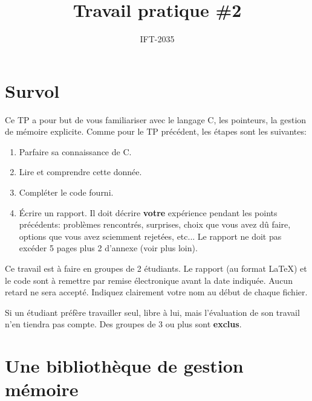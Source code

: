 \documentclass{article}
\title{Travail pratique \#2}
\author{IFT-2035}
\begin{document}
\maketitle

\newcommand \mML {\ensuremath\mu\textsl{ML}}
\newcommand \kw [1] {\textsf{#1}}
\newcommand \id [1] {\textsl{#1}}
\newcommand \punc [1] {\kw{`#1'}}
\newenvironment{outitemize}{
  \begin{itemize}
  \let \origitem \item \def \item {\origitem[]\hspace{-18pt}}
}{
  \end{itemize}
}

\section{Survol}

Ce TP a pour but de vous familiariser avec le langage C, les pointeurs,
la gestion de mémoire explicite.
Comme pour le TP précédent, les étapes sont les suivantes:
\begin{enumerate}
\item Parfaire sa connaissance de C.
\item Lire et comprendre cette donnée.
\item Compléter le code fourni.
\item Écrire un rapport.  Il doit décrire \textbf{votre} expérience pendant
  les points précédents: problèmes rencontrés, surprises, choix que vous
  avez dû faire, options que vous avez sciemment rejetées, etc...  Le
  rapport ne doit pas excéder 5 pages plus 2 d'annexe (voir plus loin).
\end{enumerate}
Ce travail est à faire en groupes de 2 étudiants.  Le rapport (au format
\LaTeX) et le code sont à remettre par remise électronique avant la date
indiquée.  Aucun retard ne sera accepté.  Indiquez clairement votre nom au
début de chaque fichier.

Si un étudiant préfère travailler seul, libre à lui, mais l'évaluation de
son travail n'en tiendra pas compte.
Des groupes de 3 ou plus sont \textbf{exclus}.

\section{Une bibliothèque de gestion mémoire}
\end{document}
